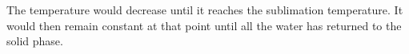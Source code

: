 The temperature would decrease until it reaches the sublimation temperature. It would then remain constant at that point until all the water has returned to the solid phase.